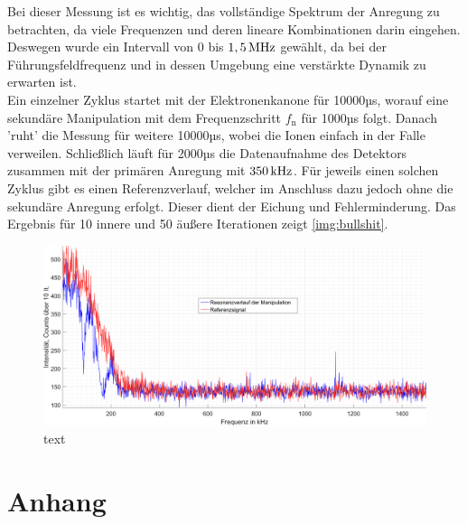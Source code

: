 \documentclass[numbers=noenddot,a4paper,notitlepage,twoside,BCOR15mm]{scrartcl}
\newcommand{\ix}[1]{_\text{#1}}
\begin{document}
			Bei dieser Messung ist es wichtig, das vollständige Spektrum der Anregung zu betrachten, da viele Frequenzen und deren lineare Kombinationen darin eingehen. Deswegen wurde ein Intervall von 0 bis $\unit[1,5]{MHz}$ gewählt, da bei der Führungsfeldfrequenz und in dessen Umgebung eine verstärkte Dynamik zu erwarten ist.\\
			Ein einzelner Zyklus startet mit der Elektronenkanone für 10000µs, worauf eine sekundäre Manipulation mit dem Frequenzschritt $f\ix{n}$ für 1000µs folgt. Danach 'ruht' die Messung für weitere 10000µs, wobei die Ionen einfach in der Falle verweilen. Schließlich läuft für 2000µs die Datenaufnahme des Detektors zusammen mit der primären Anregung mit $\unit[350]{kHz}$. Für jeweils einen solchen Zyklus gibt es einen Referenzverlauf, welcher im Anschluss dazu jedoch ohne die sekundäre Anregung erfolgt. Dieser dient der Eichung und Fehlerminderung. Das Ergebnis für 10 innere und 50 äußere Iterationen zeigt \autoref{img:bullshit}.

				\begin{figure}[h]
					\includegraphics[width=\textwidth]{volle_daten.png}
					\caption{text}\label{img:bullshit}
				\end{figure}

			

	\newpage
	\section{Anhang}

		
		
\end{document}

